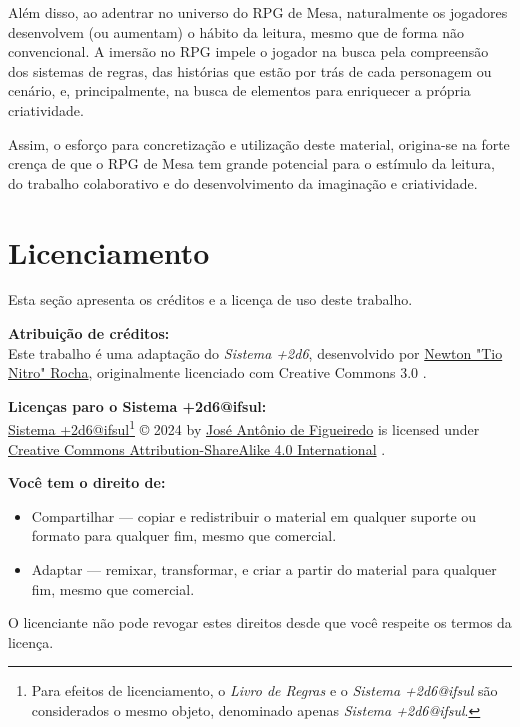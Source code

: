 Além disso, ao adentrar no universo do RPG de Mesa, naturalmente os jogadores desenvolvem (ou aumentam) o hábito da leitura, mesmo que de forma não convencional. A imersão no RPG impele o jogador na busca pela compreensão dos sistemas de regras, das histórias que estão por trás de cada personagem ou cenário, e, principalmente, na busca de elementos para enriquecer a própria criatividade.

Assim, o esforço para concretização e utilização deste material, origina-se na forte crença de que o RPG de Mesa tem grande potencial para o estímulo da leitura, do trabalho colaborativo e do desenvolvimento da imaginação e criatividade.

\section{\label{sec:cred}Licenciamento} 
Esta seção apresenta os créditos e a licença de uso deste trabalho.

\noindent \textbf{Atribuição de créditos:} \\
\indent Este trabalho é uma adaptação do \emph{Sistema +2d6}, desenvolvido por \href{http://newtonrocha.wordpress.com/}{Newton "Tio Nitro" Rocha}, originalmente licenciado com Creative Commons 3.0 \ccby.

\noindent \textbf{Licenças paro o Sistema +2d6@ifsul:} \\
\indent \href{https://github.com/josefigueiredo/Sistema2d6-ifsul}{Sistema +2d6@ifsul}\footnote{Para efeitos de licenciamento, o \emph{Livro de Regras} e o \emph{Sistema +2d6@ifsul} são considerados o mesmo objeto, denominado apenas \emph{Sistema +2d6@ifsul}.} © 2024 by \href{https://josefigueiredo.github.io/}{José Antônio de Figueiredo} is licensed under \href{https://creativecommons.org/licenses/by-sa/4.0/?ref=chooser-v1}{Creative Commons Attribution-ShareAlike 4.0 International} \ccbysa.

\textbf{Você tem o direito de:}
\begin{itemize}
	\item Compartilhar — copiar e redistribuir o material em qualquer suporte ou formato para qualquer fim, mesmo que comercial.
	\item Adaptar — remixar, transformar, e criar a partir do material para qualquer fim, mesmo que comercial.
\end{itemize}

O licenciante não pode revogar estes direitos desde que você respeite os termos da licença.

